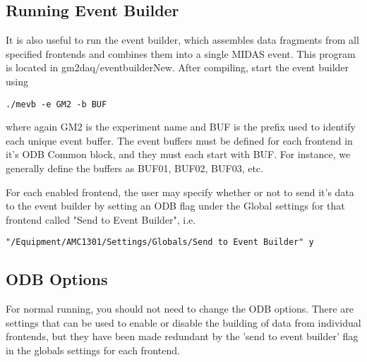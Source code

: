 \subsection{Running Event Builder}

It is also useful to run the event builder, which assembles data fragments from all specified frontends and combines them into a single MIDAS event. This program is located in gm2daq/eventbuilderNew. After compiling, start the event builder using

\begin{verbatim}
./mevb -e GM2 -b BUF
\end{verbatim}

where again GM2 is the experiment name and BUF is the prefix used to identify each unique event buffer. The event buffers must be defined for each frontend in it's ODB Common block, and they must each start with BUF. For instance, we generally define the buffers as BUF01, BUF02, BUF03, etc. 

For each enabled frontend, the user may specify whether or not to send it's data to the event builder by setting an ODB flag under the Global settings for that frontend called "Send to Event Builder", i.e.

\begin{verbatim}
"/Equipment/AMC1301/Settings/Globals/Send to Event Builder" y
\end{verbatim}

\subsection{ODB Options}

For normal running, you should not need to change the ODB options. There are settings that can be used to enable or disable the building of data from individual frontends, but they have been made redundant by the 'send to event builder' flag in the globals settings for each frontend.